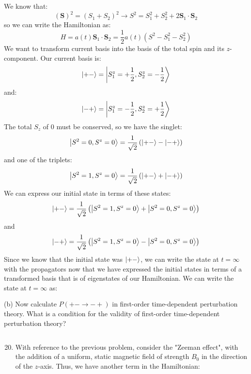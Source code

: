 \documentclass[12pt]{article}
\begin{document}
\subsection{}
We know that:
\begin{equation}
  (\mathbf{S})^2 = (S_1 + S_2)^2 \rightarrow S^2 = S_1^2 + S_2^2 + 2\mathbf{S}_1 \cdot \mathbf{S}_2
\end{equation}
so we can write the Hamiltonian as:
\begin{equation}
  H = a(t) \mathbf{S}_1 \cdot \mathbf{S}_2 = \frac{1}{2}a(t) \left(S^2 - S_1^2 - S_2^2\right) 
\end{equation}
We want to transform current basis into the basis of the total spin and its $z$-component. Our current basis is:
\begin{equation}
  \ket{+-} = \ket{S_1^z = +\frac{1}{2}, S_2^z = -\frac{1}{2}}
\end{equation}
and:
\begin{equation}
  \ket{-+} = \ket{S_1^z = -\frac{1}{2}, S_2^z = +\frac{1}{2}}
\end{equation}
The total $S_z$ of 0 must be conserved, so we have the singlet:
\begin{equation}
  \ket{S^2 = 0, S^z = 0} = \frac{1}{\sqrt{2}}\left(\ket{+-} - \ket{-+}\right)
\end{equation}
and one of the triplets:
\begin{equation}
  \ket{S^2 = 1, S^z = 0} = \frac{1}{\sqrt{2}}\left(\ket{+-} + \ket{-+}\right)
\end{equation}
We can express our initial state in terms of these states:
\begin{equation}
  \ket{+-} = \frac{1}{\sqrt{2}}\left(\ket{S^2 = 1, S^z = 0} + \ket{S^2 = 0, S^z = 0}\right)
\end{equation}
and
\begin{equation}
  \ket{-+} = \frac{1}{\sqrt{2}}\left(\ket{S^2 = 1, S^z = 0} - \ket{S^2 = 0, S^z = 0}\right)
\end{equation}
Since we know that the initial state was $\ket{+-}$, we can write the state at $t=\infty$ with the propagators now that we have expressed the initial states in terms of a transformed basis that is of eigenstates of our Hamiltonian. We can write the state at $t=\infty$ as:


(b) Now calculate $P(+-\rightarrow-+)$ in first-order time-dependent perturbation theory. What is a condition for the validity of first-order time-dependent perturbation theory?
\subsection{}
\begin{enumerate}
  \setcounter{enumi}{19}
  \item With reference to the previous problem, consider the "Zeeman effect", with the addition of a uniform, static magnetic field of strength $B_{0}$ in the direction of the $z$-axis. Thus, we have another term in the Hamiltonian:
\end{enumerate}
\end{document}
